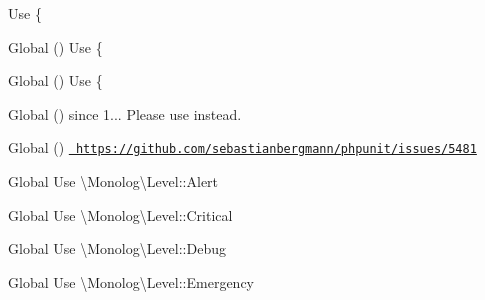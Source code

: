 \begin{DoxyRefList}
%
Use \{ 
\item[Global \doxylink{class_ramsey_1_1_uuid_1_1_lazy_1_1_lazy_uuid_from_string_a2b105a04ff09668e62f3f5da9ab7ff1f}{Lazy\+Uuid\+From\+String\+::get\+Time\+Mid} ()]\label{deprecated__deprecated000314}%
%
Use \{ 
\item[Global \doxylink{class_ramsey_1_1_uuid_1_1_lazy_1_1_lazy_uuid_from_string_a92aa1d82129ec8cd803d64c28efcb30f}{Lazy\+Uuid\+From\+String\+::get\+Timestamp} ()]\label{deprecated__deprecated000315}%
%
Use \{ 
\item[Global \doxylink{interface_mockery_1_1_legacy_mock_interface_accfe7d54e5fc5c8de26f7c5c24f2d4ba}{Legacy\+Mock\+Interface\+::should\+Defer\+Missing} ()]\label{deprecated__deprecated000087}%
%
since 1... Please use  instead. 
\item[Global \doxylink{class_p_h_p_unit_1_1_text_u_i_1_1_command_1_1_list_tests_as_xml_command_a1909f4b7f8129c7790cb75de2ffbe1e4}{List\+Tests\+As\+Xml\+Command\+::execute} ()]\label{deprecated__deprecated000225}%
%
\href{https://github.com/sebastianbergmann/phpunit/issues/5481}{\texttt{ https\+://github.\+com/sebastianbergmann/phpunit/issues/5481}}  
\item[Global \doxylink{class_monolog_1_1_logger_a037a7f6e892e6adb07c2aa099fbaf69d}{Logger\+::ALERT} ]\label{deprecated__deprecated000101}%
%
Use \textbackslash{}\+Monolog\textbackslash{}\+Level\+::\+Alert  
\item[Global \doxylink{class_monolog_1_1_logger_a5e924d1434e5b36fdc72dd03b1a8f744}{Logger\+::CRITICAL} ]\label{deprecated__deprecated000100}%
%
Use \textbackslash{}\+Monolog\textbackslash{}\+Level\+::\+Critical  
\item[Global \doxylink{class_monolog_1_1_logger_a758c150b67e476ecf77478f16b387c61}{Logger\+::DEBUG} ]\label{deprecated__deprecated000095}%
%
Use \textbackslash{}\+Monolog\textbackslash{}\+Level\+::\+Debug  
\item[Global \doxylink{class_monolog_1_1_logger_ad93131122361f85c70dab2636fe863a5}{Logger\+::EMERGENCY} ]\label{deprecated__deprecated000102}%
%
Use \textbackslash{}\+Monolog\textbackslash{}\+Level\+::\+Emergency  

\end{DoxyRefList}
